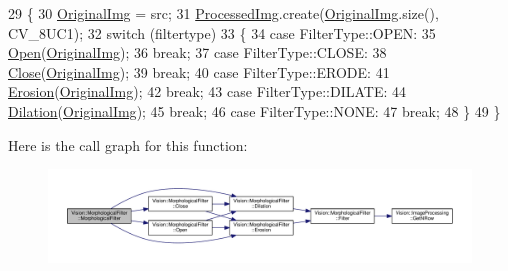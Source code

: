 \begin{DoxyCode}
29     \{
30         \hyperlink{class_vision_1_1_image_processing_a77c370dab270158a4e9c634e2d3f48e7}{OriginalImg} = src;
31         \hyperlink{class_vision_1_1_image_processing_aa7d65742882cd1b2a1e4e9cb68809211}{ProcessedImg}.create(\hyperlink{class_vision_1_1_image_processing_a77c370dab270158a4e9c634e2d3f48e7}{OriginalImg}.size(), CV\_8UC1);
32         \textcolor{keywordflow}{switch}  (filtertype)
33         \{
34              \textcolor{keywordflow}{case} FilterType::OPEN:
35                   \hyperlink{class_vision_1_1_morphological_filter_a5e57dd85a3c583242b62c5669deab9a0}{Open}(\hyperlink{class_vision_1_1_image_processing_a77c370dab270158a4e9c634e2d3f48e7}{OriginalImg});
36                 \textcolor{keywordflow}{break};
37              \textcolor{keywordflow}{case} FilterType::CLOSE:
38                   \hyperlink{class_vision_1_1_morphological_filter_ad18de4b3b27d7cd0465cd7f8c3d0b52f}{Close}(\hyperlink{class_vision_1_1_image_processing_a77c370dab270158a4e9c634e2d3f48e7}{OriginalImg});
39                  \textcolor{keywordflow}{break};
40              \textcolor{keywordflow}{case} FilterType::ERODE:
41                   \hyperlink{class_vision_1_1_morphological_filter_a62ad82519dc19be6367193a5d539c98b}{Erosion}(\hyperlink{class_vision_1_1_image_processing_a77c370dab270158a4e9c634e2d3f48e7}{OriginalImg});
42                  \textcolor{keywordflow}{break};
43              \textcolor{keywordflow}{case} FilterType::DILATE:
44                   \hyperlink{class_vision_1_1_morphological_filter_abfba03324b8dd0280925463941345417}{Dilation}(\hyperlink{class_vision_1_1_image_processing_a77c370dab270158a4e9c634e2d3f48e7}{OriginalImg});
45                  \textcolor{keywordflow}{break};
46             \textcolor{keywordflow}{case} FilterType::NONE:
47                 \textcolor{keywordflow}{break};
48         \}
49     \}
\end{DoxyCode}


Here is the call graph for this function\+:\nopagebreak
\begin{figure}[H]
\begin{center}
\leavevmode
\includegraphics[width=350pt]{class_vision_1_1_morphological_filter_a629a6d6a08e47bad397dea88506ee18a_cgraph}
\end{center}
\end{figure}


